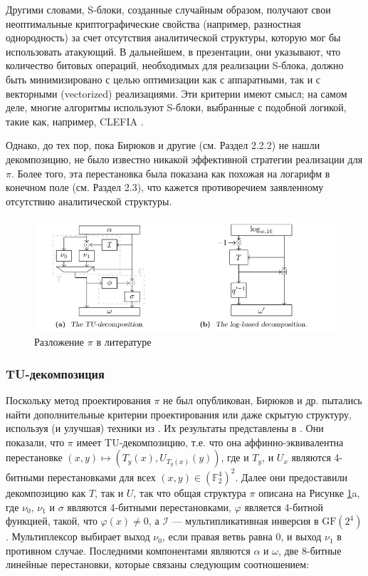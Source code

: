Другими словами, S-блоки, созданные случайным образом, получают свои неоптимальные криптографические свойства (например, разностная однородность) за счет отсутствия аналитической структуры, которую мог бы использовать атакующий. В дальнейшем, в презентации, они указывают, что количество битовых операций, необходимых для реализации S-блока, должно быть минимизировано с целью оптимизации как с аппаратными, так и с векторными (vectorized) реализациями. Эти критерии имеют смысл; на самом деле, многие алгоритмы используют S-блоки, выбранные с подобной логикой, такие как, например, CLEFIA \cite{SSA+07}.

Однако, до тех пор, пока Бирюков и другие \cite{BPU16a} (см. Раздел 2.2.2) не нашли декомпозицию, не было известно никакой эффективной стратегии реализации для \(\pi\). Более того, эта перестановка была показана как похожая на логарифм в конечном поле \cite{PU16} (см. Раздел 2.3), что кажется противоречием заявленному отсутствию аналитической структуры.

\begin{figure}
        \centering
        \includegraphics[scale=0.7]{contents/pics/decomposite.png}
        \caption{Разложение \(\pi\) в литературе}
        \label{fig:fig01}
\end{figure}

\subsubsection{TU-декомпозиция}
Поскольку метод проектирования \(\pi\) не был опубликован, Бирюков и др. пытались найти дополнительные критерии проектирования или даже скрытую структуру, используя (и улучшая) техники из \cite{BP15}. Их результаты представлены в \cite{BPU16a, BPU16b}. Они показали, что \(\pi\) имеет TU-декомпозицию, т.е. что она аффинно-эквивалентна перестановке \((x, y) \mapsto (T_y(x), U_{T_y(x)}(y))\), где и \(T_y\), и \(U_x\) являются 4-битными перестановками для всех \((x, y) \in (\mathbb{F}_2^4)^2\). Далее они предоставили декомпозицию как \(T\), так и \(U\), так что общая структура \(\pi\) описана на Рисунке \ref{fig:fig01}a, где \(\nu_0\), \(\nu_1\) и \(\sigma\) являются 4-битными перестановками, \(\varphi\) является 4-битной функцией, такой, что \(\varphi(x) \neq 0\), а \(\mathcal{I}\) — мультипликативная инверсия в \(\text{GF}(2^4)\). Мультиплексор выбирает выход \(\nu_0\), если правая ветвь равна 0, и выход \(\nu_1\) в противном случае. Последними компонентами являются \(\alpha\) и \(\omega\), две 8-битные линейные перестановки, которые связаны следующим соотношением:


